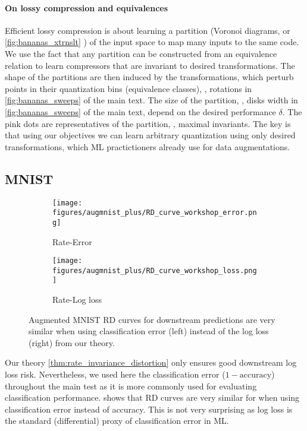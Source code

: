 \documentclass[final]{article}
\begin{document}
\paragraph{On lossy compression and equivalences}
Efficient lossy compression is about learning a partition (\eg Voronoi diagrams, or  \cref{fig:bananas_xtrnslt} ) of the input space to map many inputs to the same code.
We use the fact that any partition can be constructed from an equivalence relation \cite{schechter_handbook_1996} to learn compressors that are invariant to desired transformations.
The shape of the partitions are then induced by the transformations, which perturb points in their quantization bins (equivalence classes), \eg, rotations in \cref{fig:bananas_sweeps} of the main text.
The size of the partition, \eg, disks width in \cref{fig:bananas_sweeps} of the main text, depend on the desired performance $\delta$.
The pink dots are representatives of the partition, \ie, maximal invariants.
The key is that using our objectives we can learn arbitrary quantization using only desired transformations, which ML practictioners already use for data augmentations.


\subsection{MNIST}
\label{appx:mnist}





\begin{figure}[ht]
     \centering
     \begin{subfigure}[h]{0.4\columnwidth}
         \centering
         \texttt{[image: figures/augmnist\_plus/RD\_curve\_workshop\_error.png]}
         \caption{Rate-Error}
         \label{fig:augmnist++_err}
     \end{subfigure}
     \hfill{}
     \begin{subfigure}[h]{0.4\columnwidth}
         \centering
         \texttt{[image: figures/augmnist\_plus/RD\_curve\_workshop\_loss.png]}
         \caption{Rate-Log loss}
         \label{fig:augmnist++_log}
     \end{subfigure}
\caption{
Augmented MNIST RD curves for downstream predictions are very similar when using classification error (left) instead of the log loss (right) from our theory.
}
\label{fig:augmnist++_err_vs_log}
\end{figure} 
Our theory \cref{thm:rate_invariance_distortion} only ensures good downstream log loss risk.
Nevertheless, we used here the classification error ($1-\text{accuracy}$) throughout the main test as it is more commonly used for evaluating classification performance.
 shows that RD curves are very similar for when using classification error instead of accuracy.
This is not very surprising as log loss is the standard (differential) proxy of classification error in ML.
\end{document}
